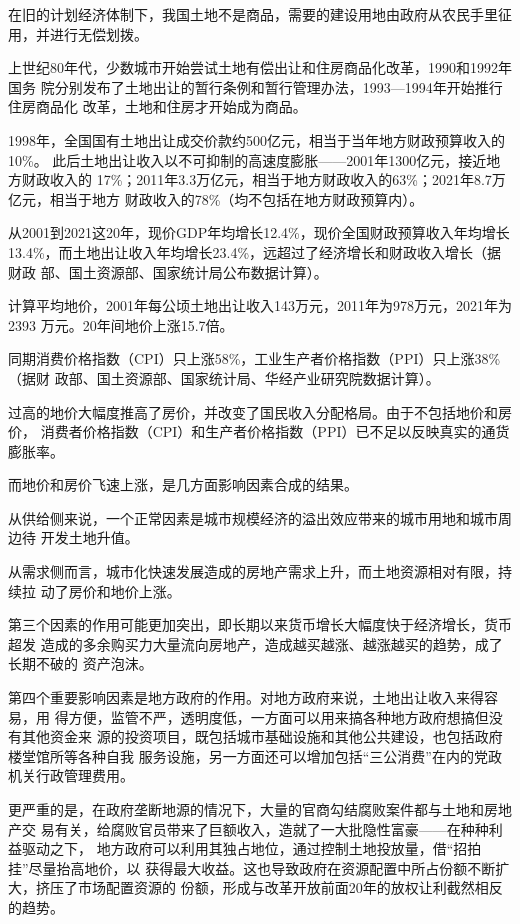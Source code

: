 在旧的计划经济体制下，我国土地不是商品，需要的建设用地由政府从农民手里征用，并进行无偿划拨。

上世纪80年代，少数城市开始尝试土地有偿出让和住房商品化改革，1990和1992年国务
院分别发布了土地出让的暂行条例和暂行管理办法，1993—1994年开始推行住房商品化
改革，土地和住房才开始成为商品。

1998年，全国国有土地出让成交价款约500亿元，相当于当年地方财政预算收入的10\%。
此后土地出让收入以不可抑制的高速度膨胀——2001年1300亿元，接近地方财政收入的
17\%；2011年3.3万亿元，相当于地方财政收入的63\%；2021年8.7万亿元，相当于地方
财政收入的78\%（均不包括在地方财政预算内）。

从2001到2021这20年，现价GDP年均增长12.4\%，现价全国财政预算收入年均增长
13.4\%，而土地出让收入年均增长23.4\%，远超过了经济增长和财政收入增长（据财政
部、国土资源部、国家统计局公布数据计算）。

计算平均地价，2001年每公顷土地出让收入143万元，2011年为978万元，2021年为2393
万元。20年间地价上涨15.7倍。

同期消费价格指数（CPI）只上涨58\%，工业生产者价格指数（PPI）只上涨38\%（据财
政部、国土资源部、国家统计局、华经产业研究院数据计算）。

过高的地价大幅度推高了房价，并改变了国民收入分配格局。由于不包括地价和房价，
消费者价格指数（CPI）和生产者价格指数（PPI）已不足以反映真实的通货膨胀率。

而地价和房价飞速上涨，是几方面影响因素合成的结果。

从供给侧来说，一个正常因素是城市规模经济的溢出效应带来的城市用地和城市周边待
开发土地升值。

从需求侧而言，城市化快速发展造成的房地产需求上升，而土地资源相对有限，持续拉
动了房价和地价上涨。

第三个因素的作用可能更加突出，即长期以来货币增长大幅度快于经济增长，货币超发
造成的多余购买力大量流向房地产，造成越买越涨、越涨越买的趋势，成了长期不破的
资产泡沫。

第四个重要影响因素是地方政府的作用。对地方政府来说，土地出让收入来得容易，用
得方便，监管不严，透明度低，一方面可以用来搞各种地方政府想搞但没有其他资金来
源的投资项目，既包括城市基础设施和其他公共建设，也包括政府楼堂馆所等各种自我
服务设施，另一方面还可以增加包括“三公消费”在内的党政机关行政管理费用。

更严重的是，在政府垄断地源的情况下，大量的官商勾结腐败案件都与土地和房地产交
易有关，给腐败官员带来了巨额收入，造就了一大批隐性富豪——在种种利益驱动之下，
地方政府可以利用其独占地位，通过控制土地投放量，借“招拍挂”尽量抬高地价，以
获得最大收益。这也导致政府在资源配置中所占份额不断扩大，挤压了市场配置资源的
份额，形成与改革开放前面20年的放权让利截然相反的趋势。

